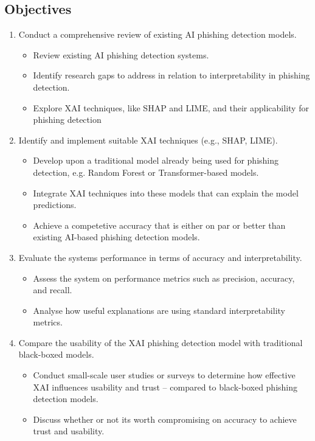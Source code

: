 
\subsection*{Objectives}

\begin{enumerate}
    \item Conduct a comprehensive review of existing AI phishing detection models.
        \begin{itemize}
            \item Review existing AI phishing detection systems.
            \item Identify research gaps to address in relation to interpretability in phishing detection.
            \item Explore XAI techniques, like SHAP and LIME, and their applicability for phishing detection
        \end{itemize}
    \item Identify and implement suitable XAI techniques (e.g., SHAP, LIME).
        \begin{itemize}
            \item Develop upon a traditional model already being used for phishing detection, e.g. Random Forest or Transformer-based models.
            \item Integrate XAI techniques into these models that can explain the model predictions.
            \item Achieve a competetive accuracy that is either on par or better than existing AI-based phishing detection models.
        \end{itemize}
    \item Evaluate the system\textquotesingle s performance in terms of accuracy and interpretability.
        \begin{itemize}
            \item Assess the system on performance metrics such as precision, accuracy, and recall.
            \item Analyse how useful explanations are using standard interpretability metrics.
        \end{itemize}
    \item Compare the usability of the XAI phishing detection model with traditional black-boxed models.
        \begin{itemize}
            \item Conduct small-scale user studies or surveys to determine how effective XAI influences usability and trust -- compared to black-boxed phishing detection models.
            \item Discuss whether or not its worth compromising on accuracy to achieve trust and usability.
        \end{itemize}
\end{enumerate}
